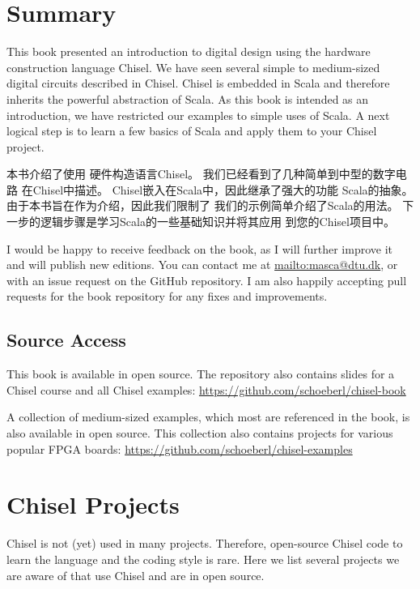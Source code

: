 \documentclass[%
    10pt,
    headinclude, footexclude,
    openright, %
    notitlepage,
    cleardoubleempty,
    headsepline,
    pointlessnumbers,
    bibtotoc, idxtotoc,
    ]{scrbook}
\begin{document}
{\chapter{Summary}
\label{sec:conclusion}

This book presented an introduction to digital design using the
hardware construction language Chisel.
We have seen several simple to medium-sized digital circuits
described in Chisel.
Chisel is embedded in Scala and therefore inherits the powerful
abstraction of Scala.
As this book is intended as an introduction, we have restricted
our examples to simple uses of Scala.
A next logical step is to learn a few basics of Scala and apply them
to your Chisel project.

本书介绍了使用
硬件构造语言Chisel。
我们已经看到了几种简单到中型的数字电路
在Chisel中描述。
Chisel嵌入在Scala中，因此继承了强大的功能
Scala的抽象。
由于本书旨在作为介绍，因此我们限制了
我们的示例简单介绍了Scala的用法。
下一步的逻辑步骤是学习Scala的一些基础知识并将其应用
到您的Chisel项目中。

I would be happy to receive feedback on the book, as I will further
improve it and will publish new editions. You can contact me at
\url{mailto:masca@dtu.dk}, or with an issue request on the GitHub
repository. I am also happily accepting pull requests
for the book repository for any fixes and improvements.

\section*{Source Access}

This book is available in open source.
The repository also contains slides for a Chisel course and
all Chisel examples: \url{https://github.com/schoeberl/chisel-book}

A collection of medium-sized examples, which most are referenced
in the book, is also available in open source. This collection
also contains projects for various popular FPGA boards:
\url{https://github.com/schoeberl/chisel-examples}

\appendix

\chapter{Chisel Projects}

Chisel is not (yet) used in many projects. Therefore, open-source Chisel code
to learn the language and the coding style is rare. Here we list several projects
we are aware of that use Chisel and are in open source.

}
\end{document}

